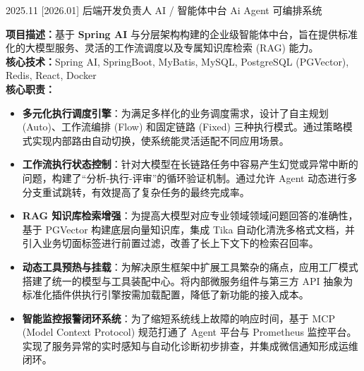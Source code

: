 \documentclass[zh]{resume}
\begin{document}
\begin{projects}
  \project%
    {2025.11}%
    [2026.01]%
    {后端开发负责人}%
    {AI / 智能体中台}%
    {\large Ai Agent 可编排系统}%
    {\textbf{项目描述：}基于 \textbf{Spring AI} 与分层架构构建的企业级智能体中台，旨在提供标准化的大模型服务、灵活的工作流调度以及专属知识库检索 (RAG) 能力。 \\
    \textbf{核心技术：}Spring AI, SpringBoot, MyBatis, MySQL, PostgreSQL (PGVector), Redis, React, Docker
    \vspace{0.5ex} \\ \textbf{核心职责：}
    \begin{itemize}
      \item \textbf{多元化执行调度引擎}：为满足多样化的业务调度需求，设计了自主规划 (Auto)、工作流编排 (Flow) 和固定链路 (Fixed) 三种执行模式。通过策略模式实现内部路由自动切换，使系统能灵活适配不同应用场景。
      \item \textbf{工作流执行状态控制}：针对大模型在长链路任务中容易产生幻觉或异常中断的问题，构建了“分析-执行-评审”的循环验证机制。通过允许 Agent 动态进行多分支重试跳转，有效提高了复杂任务的最终完成率。
      \item \textbf{RAG 知识库检索增强}：为提高大模型对应专业领域领域问题回答的准确性，基于 PGVector 构建底层向量知识库，集成 Tika 自动化清洗多格式文档，并引入业务切面标签进行前置过滤，改善了长上下文下的检索召回率。
      \item \textbf{动态工具预热与挂载}：为解决原生框架中扩展工具繁杂的痛点，应用工厂模式搭建了统一的模型与工具装配中心。将内部微服务组件与第三方 API 抽象为标准化插件供执行引擎按需加载配置，降低了新功能的接入成本。
      \item \textbf{智能监控报警闭环系统}：为了缩短系统线上故障的响应时间，基于 MCP (Model Context Protocol) 规范打通了 Agent 平台与 Prometheus 监控平台。实现了服务异常的实时感知与自动化诊断初步排查，并集成微信通知形成运维闭环。
    \end{itemize}}
\end{projects}

\begin{competences}[8.5em]
\end{competences}
\end{document}
